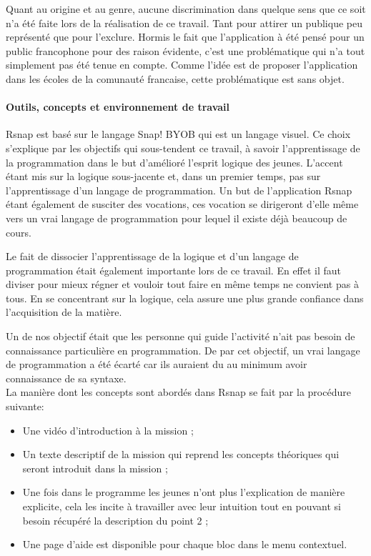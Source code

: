 Quant au origine et au genre, aucune discrimination dans quelque sens que ce soit n'a été faite lors de la réalisation de ce travail. Tant pour attirer un publique peu représenté que pour l'exclure. Hormis le fait que l'application à été pensé pour un public francophone pour des raison évidente, c'est une problématique qui n'a tout simplement pas été tenue en compte. Comme l'idée est de proposer l'application dans les écoles de la comunauté francaise, cette problématique est sans objet.

\paragraph{Outils, concepts et environnement de travail} Rsnap est basé sur le langage Snap! BYOB qui est un langage visuel. Ce choix s'explique par les objectifs qui sous-tendent ce travail, à savoir l'apprentissage de la programmation dans le but d'amélioré l'esprit logique des jeunes. L'accent étant mis sur la logique sous-jacente et, dans un premier temps, pas sur l'apprentissage d'un langage de programmation. Un but de l'application Rsnap étant également de susciter des vocations, ces vocation se dirigeront d'elle même vers un vrai langage de programmation pour lequel il existe déjà beaucoup de cours. 

Le fait de dissocier l'apprentissage de la logique et d'un langage de programmation était également importante lors de ce travail. En effet il faut diviser pour mieux régner et vouloir tout faire en même temps ne convient pas à tous. En se concentrant sur la logique, cela assure une plus grande confiance dans l'acquisition de la matière.

Un de nos objectif était que les personne qui guide l'activité n'ait pas besoin de connaissance particulière en programmation. De par cet objectif, un vrai langage de programmation a été écarté car ils auraient du au minimum avoir connaissance de sa syntaxe.\\

La manière dont les concepts sont abordés dans Rsnap se fait par la procédure suivante:
\begin{itemize}
	\item Une vidéo d'introduction à la mission ;
	\item Un texte descriptif de la mission qui reprend les concepts théoriques qui seront introduit dans la mission ;
	\item Une fois dans le programme les jeunes n'ont plus l'explication de manière explicite, cela les incite à travailler avec leur intuition tout en pouvant si besoin récupéré la description du point 2 ;
	\item Une page d'aide est disponible pour chaque bloc dans le menu contextuel.
\end{itemize}

